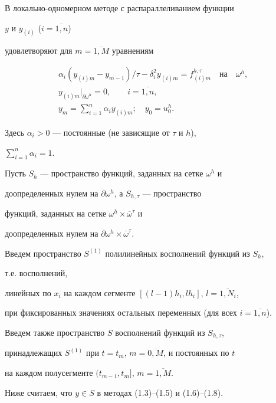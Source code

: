 В локально-одномерном методе с распараллеливанием функции


$y$ и $y_{(i)}$ ($i=\overline{1,n}$) 


удовлетворяют для $m=\overline{1,M}$ уравнениям


\begin{gather}


\alpha_i(y_{(i)m}-y_{m-1})/{\tau}-\delta^2_iy_{(i)m}=


f^{h,\tau}_{(i)m}\quad\text{на}\quad\omega^h,\\


%


y_{(i)m}\vert_{\partial\omega^h}=0,\qquad i={\overline {1,n}},\\


%


y_m=\sum_{i=1}^n\alpha_iy_{(i)m};\quad y_0=u_0^h.


\end{gather}


Здесь $\alpha_i>0$ --- постоянные (не зависящие от $\tau$ и $h$), 


$\sum_{i=1}^n\alpha_i=1$.





Пусть $S_h$ --- пространство функций, заданных на сетке $\omega^h$ и 


доопределенных нулем на $\partial\omega^h$, а $S_{h,\tau}$ --- пространство 


функций, заданных на сетке $\omega^h\times\overline\omega^\tau$ и 


доопределенных нулем на $\partial\omega^h\times\overline\omega^\tau$.


Введем пространство $S^{(1)}$ полилинейных восполнений функций из $S_h$,


т.е. восполнений,


линейных по $x_i$ на каждом сегменте $[(l-1)h_i,lh_i]$, $l=\overline{1,N_i}$,


при фиксированных значениях остальных переменных (для всех $i=\overline{1,n}$). 


Введем также пространство $S$ восполнений функций из $S_{h,\tau}$,


принадлежащих $S^{(1)}$ при $t=t_m$, $m=\overline{0,M}$, и постоянных по $t$ 


на каждом полусегменте $(t_{m-1},t_m]$, $m=\overline{1,M}$.


Ниже считаем, что $y\in S$ в методах (1.3)--(1.5) и (1.6)--(1.8).





